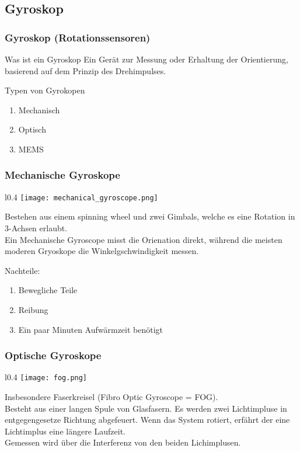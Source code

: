 \documentclass[10pt,a4paper,oneside]{beamer}
\begin{document}
\begin{frame}
  \subsection{Gyroskop}
  \frametitle{Gyroskop (Rotationssensoren)}
  
  \begin{block}{Was ist ein Gyroskop}
  Ein Gerät zur Messung oder Erhaltung der Orientierung, basierend auf dem Prinzip des Drehimpulses.
  \end{block}
  \bigskip
  Typen von Gyrokopen
  \begin{enumerate}
  	\item Mechanisch
  	\item Optisch 
  	\item MEMS
  \end{enumerate}
\end{frame}

\begin{frame}
\frametitle{Mechanische Gyroskope}
\begin{wrapfigure}{l}{0.4\textwidth}
\texttt{[image: mechanical\_gyroscope.png]} 
\end{wrapfigure}

Bestehen aus einem spinning wheel und zwei Gimbals, welche es eine Rotation in 3-Achsen erlaubt. \\
Ein Mechanische Gyroscope misst die Orienation direkt, während die meisten moderen Gryoskope die Winkelgschwindigkeit messen.

Nachteile:
\begin{enumerate}
  	\item Bewegliche Teile
  	\item Reibung
  	\item Ein paar Minuten Aufwärmzeit benötigt
  \end{enumerate}

\end{frame}


\begin{frame}
\frametitle{Optische Gyroskope}
\begin{wrapfigure}{l}{0.4\textwidth}
\texttt{[image: fog.png]} 
\end{wrapfigure}

Insbesondere Faserkreisel (Fibro Optic Gyroscope = FOG). \\
Besteht aus einer langen Spule von Glasfasern. Es werden zwei Lichtimpluse in entgegengesetze Richtung abgefeuert. Wenn das System rotiert, erfährt der eine Lichtimplus eine längere Laufzeit.\\
Gemessen wird über die Interferenz von den beiden Lichimplusen.

\end{frame}
\end{document}
